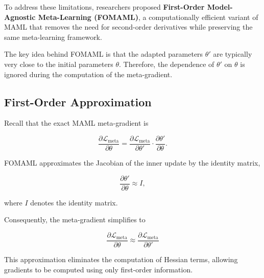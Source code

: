To address these limitations, researchers proposed \textbf{First-Order Model-Agnostic Meta-Learning (FOMAML)}, a computationally efficient variant of MAML that removes the need for second-order derivatives while preserving the same meta-learning framework.

The key idea behind FOMAML is that the adapted parameters $\theta'$ are typically very close to the initial parameters $\theta$. Therefore, the dependence of $\theta'$ on $\theta$ is ignored during the computation of the meta-gradient.

\subsection*{First-Order Approximation}

Recall that the exact MAML meta-gradient is

\[
\frac{\partial \mathcal{L}_{\text{meta}}}{\partial \theta}
=
\frac{\partial \mathcal{L}_{\text{meta}}}{\partial \theta'}
\cdot
\frac{\partial \theta'}{\partial \theta}.
\]

FOMAML approximates the Jacobian of the inner update by the identity matrix,

\[
\frac{\partial \theta'}{\partial \theta}
\approx
I,
\]

where $I$ denotes the identity matrix.

Consequently, the meta-gradient simplifies to

\[
\boxed{
\frac{\partial \mathcal{L}_{\text{meta}}}{\partial \theta}
\approx
\frac{\partial \mathcal{L}_{\text{meta}}}{\partial \theta'}
}
\]

This approximation eliminates the computation of Hessian terms, allowing gradients to be computed using only first-order information.

\vspace{0.5cm}


